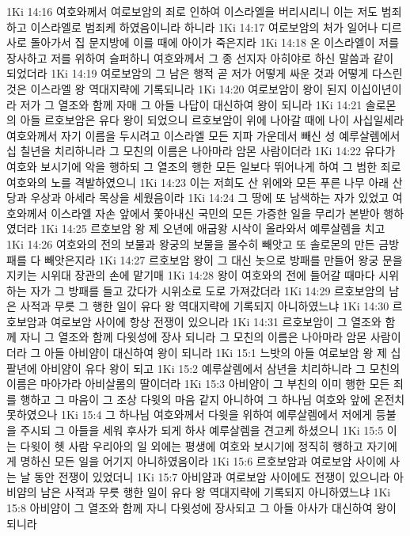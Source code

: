 1Ki 14:16  여호와께서 여로보암의 죄로 인하여 이스라엘을 버리시리니 이는 저도 범죄하고 이스라엘로 범죄케 하였음이니라 하니라
1Ki 14:17  여로보암의 처가 일어나 디르사로 돌아가서 집 문지방에 이를 때에 아이가 죽은지라
1Ki 14:18  온 이스라엘이 저를 장사하고 저를 위하여 슬퍼하니 여호와께서 그 종 선지자 아히야로 하신 말씀과 같이 되었더라
1Ki 14:19  여로보암의 그 남은 행적 곧 저가 어떻게 싸운 것과 어떻게 다스린 것은 이스라엘 왕 역대지략에 기록되니라
1Ki 14:20  여로보암이 왕이 된지 이십이년이라 저가 그 열조와 함께 자매 그 아들 나답이 대신하여 왕이 되니라
1Ki 14:21  솔로몬의 아들 르호보암은 유다 왕이 되었으니 르호보암이 위에 나아갈 때에 나이 사십일세라 여호와께서 자기 이름을 두시려고 이스라엘 모든 지파 가운데서 빼신 성 예루살렘에서 십 칠년을 치리하니라 그 모친의 이름은 나아마라 암몬 사람이더라
1Ki 14:22  유다가 여호와 보시기에 악을 행하되 그 열조의 행한 모든 일보다 뛰어나게 하여 그 범한 죄로 여호와의 노를 격발하였으니
1Ki 14:23  이는 저희도 산 위에와 모든 푸른 나무 아래 산당과 우상과 아세라 목상을 세웠음이라
1Ki 14:24  그 땅에 또 남색하는 자가 있었고 여호와께서 이스라엘 자손 앞에서 쫓아내신 국민의 모든 가증한 일을 무리가 본받아 행하였더라
1Ki 14:25  르호보암 왕 제 오년에 애굽왕 시삭이 올라와서 예루살렘을 치고
1Ki 14:26  여호와의 전의 보물과 왕궁의 보물을 몰수히 빼앗고 또 솔로몬의 만든 금방패를 다 빼앗은지라
1Ki 14:27  르호보암 왕이 그 대신 놋으로 방패를 만들어 왕궁 문을 지키는 시위대 장관의 손에 맡기매
1Ki 14:28  왕이 여호와의 전에 들어갈 때마다 시위하는 자가 그 방패를 들고 갔다가 시위소로 도로 가져갔더라
1Ki 14:29  르호보암의 남은 사적과 무릇 그 행한 일이 유다 왕 역대지략에 기록되지 아니하였느냐
1Ki 14:30  르호보암과 여로보암 사이에 항상 전쟁이 있으니라
1Ki 14:31  르호보암이 그 열조와 함께 자니 그 열조와 함께 다윗성에 장사 되니라 그 모친의 이름은 나아마라 암몬 사람이더라 그 아들 아비얌이 대신하여 왕이 되니라
1Ki 15:1  느밧의 아들 여로보암 왕 제 십팔년에 아비얌이 유다 왕이 되고
1Ki 15:2  예루살렘에서 삼년을 치리하니라 그 모친의 이름은 마아가라 아비살롬의 딸이더라
1Ki 15:3  아비얌이 그 부친의 이미 행한 모든 죄를 행하고 그 마음이 그 조상 다윗의 마음 같지 아니하여 그 하나님 여호와 앞에 온전치 못하였으나
1Ki 15:4  그 하나님 여호와께서 다윗을 위하여 예루살렘에서 저에게 등불을 주시되 그 아들을 세워 후사가 되게 하사 예루살렘을 견고케 하셨으니
1Ki 15:5  이는 다윗이 헷 사람 우리아의 일 외에는 평생에 여호와 보시기에 정직히 행하고 자기에게 명하신 모든 일을 어기지 아니하였음이라
1Ki 15:6  르호보암과 여로보암 사이에 사는 날 동안 전쟁이 있었더니
1Ki 15:7  아비얌과 여로보암 사이에도 전쟁이 있으니라 아비얌의 남은 사적과 무릇 행한 일이 유다 왕 역대지략에 기록되지 아니하였느냐
1Ki 15:8  아비얌이 그 열조와 함께 자니 다윗성에 장사되고 그 아들 아사가 대신하여 왕이 되니라
